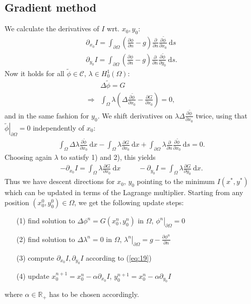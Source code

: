 \subsection{Gradient method}
We calculate the derivatives of $I$ wrt. $x_0,y_0$:
\begin{align}\label{eq:14}
	\partial_{x_0} I = \int_{\partial\Omega}
		\left(
			\frac{\partial\phi}{\partial n} - g
		\right)
		\frac{\partial}{\partial n}\frac{\partial\widetilde{\phi}}{\partial x_0}
	\:\mathrm{d}s\\
		\partial_{y_0} I = \int_{\partial\Omega}
		\left(
			\frac{\partial\phi}{\partial n} - g
		\right)
		\frac{\partial}{\partial n}\frac{\partial\widetilde{\phi}}{\partial y_0}
	\:\mathrm{d}s. \label{eq:15}
\end{align}
Now it holds for all $\widetilde{\phi}\in\mathcal{C}$, $\lambda\in H^1_0(\Omega)$:
\begin{align}\label{eq:16}
	&\Delta\widetilde{\phi} = G\\
	\Rightarrow &\int_\Omega \lambda
		\left(\Delta\frac{\partial\widetilde{\phi}}{\partial x_0}
		-\frac{\partial G}{\partial x_0}\right)
	=0,\label{eq:17}
\end{align}
and in the same fashion for $y_0$. We shift derivatives on 
$\lambda \Delta\frac{\partial\widetilde{\phi}}{\partial x_0}$
twice, using that $\left. \widetilde{\phi}\right|_{\partial\Omega}=0$ independently of $x_0$:
\begin{align}\label{eq:18}
	\int_{\Omega}\Delta\lambda \frac{\partial\widetilde{\phi}}{\partial x_0}
	\:\mathrm{d}x
	-\int_\Omega \lambda \frac{\partial G}{\partial x_0}
	\:\mathrm{d}x
	+\int_{\partial\Omega} \lambda 
		\frac{\partial}{\partial n}\frac{\partial\widetilde{\phi}}{\partial x_0}
	\:\mathrm{d}s
	=0.
\end{align}
Choosing again $\lambda$ to satisfy 1) and 2), this yields
\begin{align}\label{eq:19}
	-\partial_{x_0}I = \int_\Omega \lambda \frac{\partial G}{\partial x_0}\:\mathrm{d}x
	\hspace{30pt}
	-\partial_{y_0}I = \int_\Omega \lambda \frac{\partial G}{\partial y_0}\:\mathrm{d}x.
\end{align}
Thus we have descent directions for $x_0$, $y_0$ pointing to the minimum $I(x^*,y^*)$ which can be updated in terms of the Lagrange multiplier. Starting from any position $(x_0^0,y_0^0)\in\Omega$, we get the following update steps:
\begin{itemize}
	\item[(1)] find solution to $\Delta\phi^n = G(x_0^n,y_0^n)$ in $\Omega$, $\left. \phi^n\right|_{\partial\Omega}=0$
	\item[(2)] find solution to $\Delta\lambda^n = 0$ in $\Omega$, $\left. \lambda^n\right|_{\partial\Omega}=g-\frac{\partial \phi^n}{\partial n}$
	\item[(3)] compute $\partial_{x_0}I, \partial_{y_0}I$ according to (\ref{eq:19})
	\item[(4)] update $x_0^{n+1}=x_0^n - \alpha\partial_{x_0}I$, $y_0^{n+1}=x_0^n - \alpha\partial_{y_0}I$
\end{itemize}
where $\alpha\in\mathbb R_+$ has to be chosen accordingly.